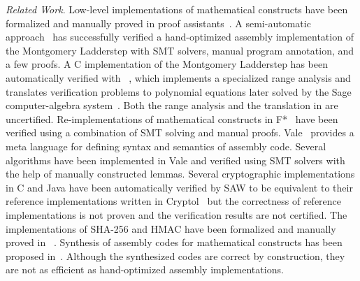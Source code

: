 
\noindent
\emph{Related Work}.
Low-level implementations of mathematical constructs have been formalized and manually proved in proof assistants~\cite{Aff13,ANY12,AM07,MG07,M:13:PPVB}.
A semi-automatic approach~\cite{C:14:VCS} has successfully verified a hand-optimized assembly implementation of the Montgomery Ladderstep with SMT solvers, manual program annotation, and a few \coq proofs.
A C implementation of the Montgomery Ladderstep has been automatically verified with \gfverif~\cite{BS:16:GFEV}, which implements a specialized range analysis and translates verification problems to polynomial equations later solved by the Sage computer-algebra system~\cite{SAGE:17:SAGE}.
Both the range analysis and the translation in \gfverif are uncertified.
Re-implementations of mathematical constructs in F*~\cite{project:everest} have been verified using a combination of SMT solving and manual proofs.
Vale~\cite{B:17:VVHP} provides a meta language for defining syntax and semantics of assembly code.
Several algorithms have been implemented in Vale and verified using SMT solvers with the help of manually constructed lemmas.
Several cryptographic implementations in C and Java have been automatically verified by SAW to be equivalent to their reference implementations written in Cryptol~\cite{T:16:AVRWCI} but the correctness of reference implementations is not proven and the verification results are not certified.
The \openssl implementations of SHA-256 and HMAC have been formalized and manually proved in \coq~\cite{A:15:VCPS,B:15:VCSOH}.
Synthesis of assembly codes for mathematical constructs has been proposed in~\cite{fiat:crypto}.
Although the synthesized codes are correct by construction, they are not as efficient as hand-optimized assembly implementations.





